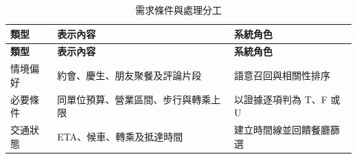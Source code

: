 {\small\singlespacing
\renewcommand{\arraystretch}{1.25}
\setlength{\tabcolsep}{3pt}
\begin{longtable}{|P{\arrayrulewidth\relax}|P{\arrayrulewidth\relax}|P{\arrayrulewidth\relax}|}
\caption{需求條件與處理分工}\label{table:condition_types}\\
\hline
\textbf{類型} & \textbf{表示內容} & \textbf{系統角色} \\ \hline
\endfirsthead
\hline
\textbf{類型} & \textbf{表示內容} & \textbf{系統角色} \\ \hline
\endhead
情境偏好 & 約會、慶生、朋友聚餐及評論片段 & 語意召回與相關性排序 \\ \hline
必要條件 & 同單位預算、營業區間、步行與轉乘上限 & 以證據逐項判為 T、F 或 U \\ \hline
交通狀態 & ETA、候車、轉乘及抵達時間 & 建立時間線並回饋餐廳篩選 \\ \hline
\end{longtable}
}
